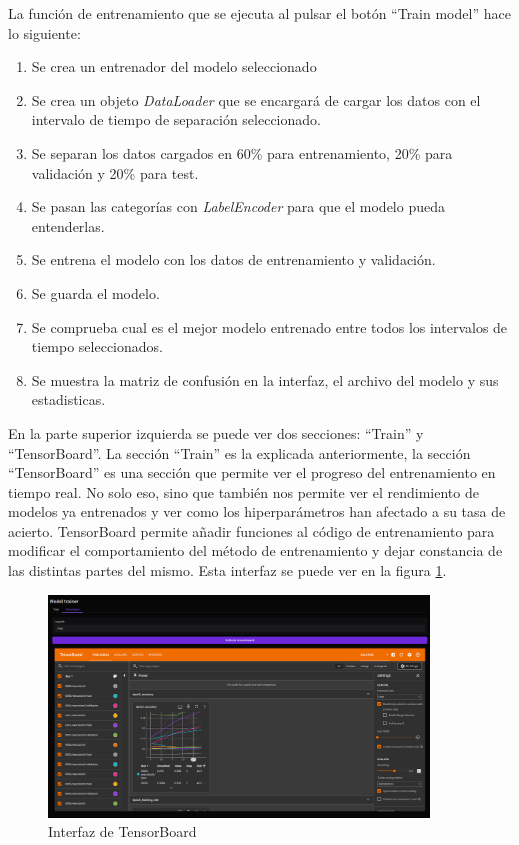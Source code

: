 La función de entrenamiento que se ejecuta al pulsar el botón ``Train model'' hace lo siguiente:
\begin{enumerate}
    \item Se crea un entrenador del modelo seleccionado
    \item Se crea un objeto \textit{DataLoader} que se encargará de cargar los datos con el intervalo de tiempo de separación seleccionado.
    \item Se separan los datos cargados en 60\% para entrenamiento, 20\% para validación y 20\% para test.
    \item Se pasan las categorías con \textit{LabelEncoder} para que el modelo pueda entenderlas.
    \item Se entrena el modelo con los datos de entrenamiento y validación.
    \item Se guarda el modelo.
    \item Se comprueba cual es el mejor modelo entrenado entre todos los intervalos de tiempo seleccionados.
    \item Se muestra la matriz de confusión en la interfaz, el archivo del modelo y sus estadisticas.
\end{enumerate}

En la parte superior izquierda se puede ver dos secciones: ``Train'' y ``TensorBoard''. La sección ``Train'' es la explicada anteriormente, la sección ``TensorBoard'' es una sección que permite ver el progreso del entrenamiento en tiempo real. No solo eso, sino que también nos permite ver el rendimiento de modelos ya entrenados y ver como los hiperparámetros han afectado a su tasa de acierto. TensorBoard permite añadir funciones al código de entrenamiento para modificar el comportamiento del método de entrenamiento y dejar constancia de las distintas partes del mismo. Esta interfaz se puede ver en la figura \ref{fig:interfaz-tensorboard}.

\begin{figure}[h!]
    \centering
    \includegraphics[width=0.9\textwidth]{Imagenes/Bitmap/interfaz-tensorboard.png}
    \caption{Interfaz de TensorBoard}
    \label{fig:interfaz-tensorboard}
\end{figure}

